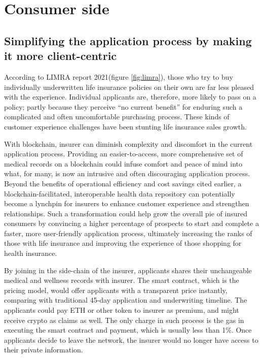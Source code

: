 \section{Consumer side}

\subsection{Simplifying the application process by making it more client-centric}

According to LIMRA report 2021(figure \ref{fig:limra}),
those who try to buy individually underwritten life insurance policies on their own are far less pleased with the experience.
Individual applicants are, therefore, more likely to pass on a policy;
partly because they perceive “no current benefit” for enduring such a complicated and often uncomfortable purchasing process.
These kinds of customer experience challenges have been stunting life insurance sales growth.

With blockchain, insurer can diminish complexity and discomfort in the current application process.
Providing an easier-to-access, more comprehensive set of medical records on a blockchain
could infuse comfort and peace of mind into what, for many, is now an intrusive and often
discouraging application process. Beyond the benefits of operational efficiency and cost
savings cited earlier, a blockchain-facilitated, interoperable health data repository can
potentially become a lynchpin for insurers to enhance customer experience and strengthen
relationships. Such a transformation could help grow the overall pie of insured consumers
by convincing a higher percentage of prospects to start and complete a faster, more
user-friendly application process, ultimately increasing the ranks of those with life
insurance and improving the experience of those shopping for health insurance.

By joining in the side-chain of the insurer, applicants shares their unchangeable
medical and wellness records with insurer. The smart contract, which is the
pricing model, would offer applicants with a transparent price instantly,
comparing with traditional 45-day application and underwriting timeline.
The applicants could pay ETH or other token to insurer as premium, and might receive
crypto as claims as well. The only charge in such process is the gas in executing
the smart contract and payment, which is usually less than 1\%.
Once applicants decide to leave the network,
the insurer would no longer have access to their private information.

